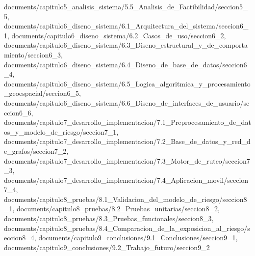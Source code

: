 \documentclass[12pt, oneside]{report}
\begin{document}
{documents/capitulo5_analisis_sistema/5.5_Analisis_de_Factibilidad/seccion5_5,
documents/capitulo6_diseno_sistema/6.1_Arquitectura_del_sistema/seccion6_1,
documents/capitulo6_diseno_sistema/6.2_Casos_de_uso/seccion6_2,
documents/capitulo6_diseno_sistema/6.3_Diseno_estructural_y_de_comportamiento/seccion6_3,
documents/capitulo6_diseno_sistema/6.4_Diseno_de_base_de_datos/seccion6_4,
documents/capitulo6_diseno_sistema/6.5_Logica_algoritmica_y_procesamiento_geoespacial/seccion6_5,
documents/capitulo6_diseno_sistema/6.6_Diseno_de_interfaces_de_usuario/seccion6_6,
documents/capitulo7_desarrollo_implementacion/7.1_Preprocesamiento_de_datos_y_modelo_de_riesgo/seccion7_1,
documents/capitulo7_desarrollo_implementacion/7.2_Base_de_datos_y_red_de_grafos/seccion7_2,
documents/capitulo7_desarrollo_implementacion/7.3_Motor_de_ruteo/seccion7_3,
documents/capitulo7_desarrollo_implementacion/7.4_Aplicacion_movil/seccion7_4,
documents/capitulo8_pruebas/8.1_Validacion_del_modelo_de_riesgo/seccion8_1,
documents/capitulo8_pruebas/8.2_Pruebas_unitarias/seccion8_2,
documents/capitulo8_pruebas/8.3_Pruebas_funcionales/seccion8_3,
documents/capitulo8_pruebas/8.4_Comparacion_de_la_exposicion_al_riesgo/seccion8_4,
documents/capitulo9_conclusiones/9.1_Conclusiones/seccion9_1,
documents/capitulo9_conclusiones/9.2_Trabajo_futuro/seccion9_2
}
\end{document}
